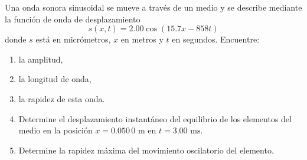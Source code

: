 \item Una onda sonora sinusoidal se mueve a través de un medio y se describe mediante la función de onda de desplazamiento
$$ s(x, t) = 2.00 \cos (15.7x - 858t) $$
donde $s$ está en micrómetros, $x$ en metros y $t$ en segundos. Encuentre:
\begin{enumerate}
    \item la amplitud,
    \item la longitud de onda,
    \item la rapidez de esta onda.
    \item Determine el desplazamiento instantáneo del equilibrio de los elementos del medio en la posición $x = 0.050\,0\text{ m}$ en $t = 3.00\text{ ms}$.
    \item Determine la rapidez máxima del movimiento oscilatorio del elemento.
\end{enumerate}
